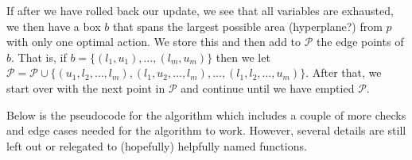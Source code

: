 \documentclass{article}
\begin{document}
If after we have rolled back our update, we see that all variables are
exhausted, we then have a box $b$ that spans the largest possible area
(hyperplane?) from $p$ with only one optimal action. We store this and then add
to $\mathcal{P}$ the edge points of $b$. That is, if $b = \{ (l_{1},
u_{1}), \ldots, (l_{m}, u_{m}) \}$ then we let $\mathcal{P} = \mathcal{P} \cup
\{ (u_{1}, l_{2}, \ldots, l_{m}), (l_{1}, u_{2}, \ldots, l_{m}), \ldots, (l_{1},
l_{2}, \ldots, u_{m}) \}$. After that, we start over with the next point in
$\mathcal{P}$ and continue until we have emptied $\mathcal{P}$.

Below is the pseudocode for the algorithm which includes a couple of more checks
and edge cases needed for the algorithm to work. However, several details are
still left out or relegated to (hopefully) helpfully named functions.
\end{document}
